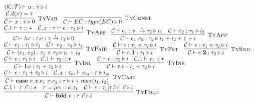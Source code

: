\documentclass[fleqn]{article}
\begin{document}
\[
\begin{array}{l}
    (\mathcal{K}; \mathcal{T}) \vdash u : \tau \triangleright i \\
    \infer[\textsc{TyVar}]{\mathcal{C} \vdash x : \tau \triangleright 0}{\mathcal{C}.2(x)=\tau} \hspace{1em}
    \infer[\textsc{TyConst}]{\mathcal{C} \vdash EC : type(EC) \triangleright 0}{} \\
    \infer[\textsc{TyAbs}]{\mathcal{C} \vdash \lambda x:\tau. e : \tau \xrightarrow{i} \tau_1 \triangleright 0}{\mathcal{C}.1 \vdash \tau :: \star & \mathcal{C},x:\tau \vdash e : \tau_1 \triangleright i} \hspace{1em}
    \infer[\textsc{TyApp}]{\mathcal{C} \vdash e_1~e_2 : \tau_2 \triangleright i_1 + i_2 + 1 + i}{\mathcal{C} \vdash e_1 : \tau_1 \xrightarrow{i} \tau_2 \triangleright i_1 & \mathcal{C} \vdash e_2 : \tau_1 \triangleright i_2} \\
    \infer[\textsc{TyPair}]{\mathcal{C} \vdash (e_1,e_2) : \tau_1 \times \tau_2 \triangleright i_1 + i_2}{\mathcal{C} \vdash e_1 : \tau_1 \triangleright i_1 & \mathcal{C} \vdash e_2 : \tau_2 \triangleright i_2} \hspace{1em}
    \infer[\textsc{TyFst}]{\mathcal{C} \vdash e.\mathbf{1} : \tau_1 \triangleright i}{\mathcal{C} \vdash e : \tau_1 \times \tau_2 \triangleright i} \hspace{1em}
    \infer[\textsc{TySnd}]{\mathcal{C} \vdash e.\mathbf{2} : \tau_2 \triangleright i}{\mathcal{C} \vdash e : \tau_1 \times \tau_2 \triangleright i} \\
    \infer[\textsc{TyInl}]{\mathcal{C} \vdash \mathbf{l}.e : \tau_1 + \tau_2 \triangleright i}{\mathcal{C} \vdash e : \tau_1 \triangleright i & \mathcal{C}.1 \vdash \tau_2 :: \star} \hspace{1em}
    \infer[\textsc{TyInr}]{\mathcal{C} \vdash \mathbf{r}.e : \tau_1 + \tau_2 \triangleright i}{\mathcal{C} \vdash e : \tau_2 \triangleright i & \mathcal{C}.1 \vdash \tau_1 :: \star} \\
    \infer[\textsc{TyCase}]{\mathcal{C} \vdash \mathbf{case}~e~x.e_1~x.e_2 : \tau \triangleright i + \max(i_1,i_2)}{\mathcal{C} \vdash e : \tau_1 + \tau_2 \triangleright i & \mathcal{C},x:\tau_m \vdash e_m : \tau \triangleright i_m} \\
    \infer[\textsc{TyFold}]{\mathcal{C} \vdash \mathbf{fold}~e : \tau~\vec{c} \triangleright i}{\mathcal{C}.1 \vdash \tau~\vec{c} :: \star & \tau = \mu \alpha :: \kappa. \tau_1 & \mathcal{C} \vdash e : \tau_1[\tau/\alpha]~\vec{c} \triangleright i} \\

\end{array}\]
\end{document}
